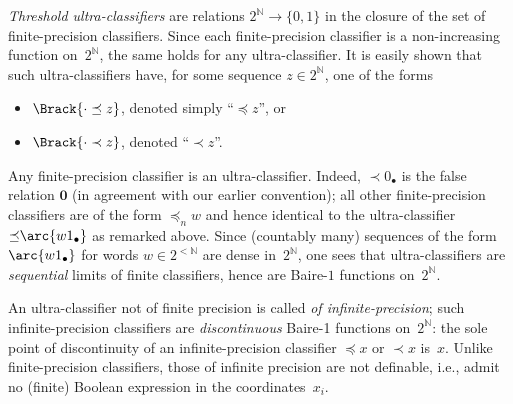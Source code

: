 \emph{Threshold ultra-classifiers} are relations $2^{\mathbb{N}}\to\{0,1\}$ in the closure of the set of finite-precision classifiers.
Since each finite-precision classifier is a non-increasing function on~$2^{\mathbb{N}}$, the same holds for any ultra-classifier.
It is easily shown that such ultra-classifiers have, for some sequence $z\in 2^{\mathbb{N}}$, one of the forms%
\begin{itemize}
\item $\Brack{\cdot\preceq z}$, denoted simply “${\preceq}z$”, or
\item $\Brack{\cdot\prec z}$, denoted “${\prec}z$”.
\end{itemize}

Any finite-precision classifier is an ultra-classifier.
Indeed, ${\prec}0_{\bullet}$ is the false relation $\mathbf{0}$ (in agreement with our earlier convention);
all other finite-precision classifiers are of the form ${\preccurlyeq}_nw$ and hence identical to the ultra-classifier ${\preceq}\arc{w1_{\bullet}}$ as remarked above.
Since (countably many) sequences of the form $\arc{w1_{\bullet}}$ for words $w\in 2^{<\mathbb{N}}$ are dense in~$2^{\mathbb{N}}$, one sees that ultra-classifiers are \emph{sequential} limits of finite classifiers, hence are Baire-$1$ functions on~$2^{\mathbb{N}}$.

An ultra-classifier not of finite precision is called \emph{of infinite-precision};
such infinite-precision classifiers are \emph{discontinuous} Baire-1 functions on~$2^{\mathbb{N}}$:
the sole point of discontinuity of an infinite-precision classifier ${\preccurlyeq}x$ or ${\prec}x$ is~$x$.
Unlike finite-precision classifiers, those of infinite precision are not definable, i.e., admit no (finite) Boolean expression in the coordinates~$x_i$.

